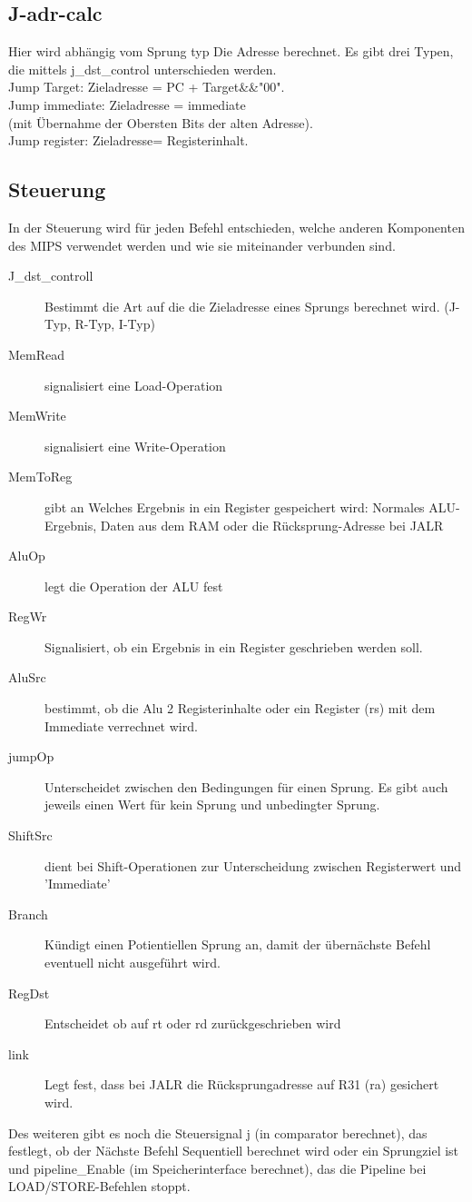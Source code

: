 \documentclass[11pt]{article} %
\begin{document}
\subsection{J-adr-calc}
Hier wird abhängig vom Sprung typ Die Adresse berechnet. Es gibt drei Typen, die mittels j\_dst\_control unterschieden werden. 
\\Jump Target: Zieladresse = PC + Target&&"00". 
\\Jump immediate: Zieladresse = immediate 
\\(mit Übernahme der Obersten Bits der alten Adresse). 
\\Jump register: Zieladresse= Registerinhalt.

\subsection{Steuerung}
In der Steuerung wird für jeden Befehl entschieden, welche anderen Komponenten des MIPS verwendet werden und wie sie miteinander verbunden sind. 

 \begin{description}
 \item[J\_dst\_controll] Bestimmt die Art auf die die Zieladresse eines Sprungs berechnet wird. (J-Typ, R-Typ, I-Typ)
 \item[MemRead] signalisiert eine Load-Operation
 \item[MemWrite] signalisiert eine Write-Operation
 \item[MemToReg] gibt an Welches Ergebnis in ein Register gespeichert wird: Normales ALU-Ergebnis, Daten aus dem RAM oder die Rücksprung-Adresse bei JALR
 \item[AluOp] legt die Operation der ALU fest
 \item[RegWr] Signalisiert, ob ein Ergebnis in ein Register geschrieben werden soll. 
 \item[AluSrc] bestimmt, ob die Alu 2 Registerinhalte oder ein Register (rs) mit dem Immediate verrechnet wird.
 \item[jumpOp] Unterscheidet zwischen den Bedingungen für einen Sprung. Es gibt auch jeweils einen Wert für kein Sprung und unbedingter Sprung.
 \item[ShiftSrc] dient bei Shift-Operationen zur Unterscheidung zwischen Registerwert und 'Immediate' 
 \item[Branch] Kündigt einen Potientiellen Sprung an, damit der übernächste Befehl eventuell nicht ausgeführt wird.
 \item[RegDst] Entscheidet ob auf rt oder rd zurückgeschrieben wird
 \item[link] Legt fest, dass bei JALR  die Rücksprungadresse auf R31 (ra) gesichert wird.
 \end{description}
 Des weiteren gibt es noch die Steuersignal j (in comparator berechnet), das festlegt, ob der Nächste Befehl Sequentiell berechnet wird oder ein Sprungziel ist und pipeline\_Enable (im Speicherinterface berechnet), das die Pipeline bei LOAD/STORE-Befehlen stoppt.
\end{document}

